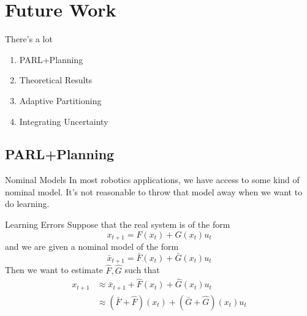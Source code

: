 \documentclass{beamer}
\begin{document}
\section{Future Work}

\begin{frame}{There's a lot}
  \begin{enumerate}
    \item PARL+Planning
    \item Theoretical Results
    \item Adaptive Partitioning
    \item Integrating Uncertainty
  \end{enumerate}
\end{frame}

\subsection{PARL+Planning}

\begin{frame}{Nominal Models}
  In most robotics applications, we have access to some kind of nominal model.
  It's not reasonable to throw that model away when we want to do learning.
\end{frame}

\begin{frame}{Learning Errors}
  Suppose that the real system is of the form
  \begin{equation*}
    x_{t+1} = F(x_t) + G(x_t)u_t
  \end{equation*}
  and we are given a nominal model of the form 
  \begin{equation*}
    \bar{x}_{t+1} = \bar{F}(x_t) + \bar{G}(x_t)u_t
  \end{equation*}
  Then we want to estimate $\hat{F}, \hat{G}$ such that 
  \begin{align*}
    x_{t+1} &\approx \bar{x}_{t+1} + \hat{F}(x_t) + \hat{G}(x_t)u_t \\
    &\approx \left(\bar{F} + \hat{F}\right)(x_t) + \left(\bar{G} + \hat{G}\right)(x_t)u_t
  \end{align*}
\end{frame}
\end{document}
